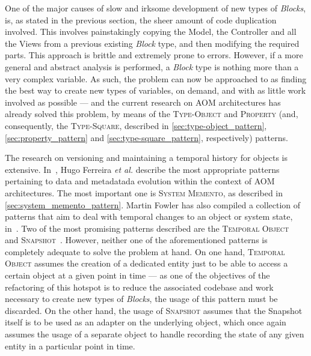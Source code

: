 One of the major causes of slow and irksome development of new types of \emph{Blocks}, is, as stated in the previous section, the sheer amount of code duplication involved. This involves painstakingly copying the Model, the Controller and all the Views from a previous existing \emph{Block} type, and then modifying the required parts. This approach is brittle and extremely prone to errors. However, if a more general and abstract analysis is performed, a \emph{Block} type is nothing more than a very complex variable. As such, the problem can now be approached to as finding the best way to create new types of variables, on demand, and with as little work involved as possible --- and the current research on AOM architectures has already solved this problem, by means of the \textsc{Type-Object} and \textsc{Property} (and, consequently, the \textsc{Type-Square}, described in \ref{sec:type-object_pattern}, \ref{sec:property_pattern} and \ref{sec:type-square_pattern}, respectively) patterns.

The research on versioning and maintaining a temporal history for objects is extensive. In~\cite{patterns_data_and_metadata_evolution_in_aoms}, Hugo Ferreira \textit{et al.} describe the most appropriate patterns pertaining to data and metadatada evolution within the context of AOM architectures. The most important one is \textsc{System Memento}, as described in \ref{sec:system_memento_pattern}. Martin Fowler has also compiled a collection of patterns that aim to deal with temporal changes to an object or system state, in~\cite{fowler_pattern_for_things_that_change_with_time}. Two of the most promising patterns described are the \textsc{Temporal Object}~\cite{fowler_temporal_object} and \textsc{Snapshot}~\cite{fowler_snapshot}. However, neither one of the aforementioned patterns is completely adequate to solve the problem at hand. On one hand, \textsc{Temporal Object} assumes the creation of a dedicated entity just to be able to access a certain object at a given point in time --- as one of the objectives of the refactoring of this hotspot is to reduce the associated codebase and work necessary to create new types of \emph{Blocks}, the usage of this pattern must be discarded. On the other hand, the usage of \textsc{Snapshot} assumes that the Snapshot itself is to be used as an adapter on the underlying object, which once again assumes the usage of a separate object to handle recording the state of any given entity in a particular point in time.

